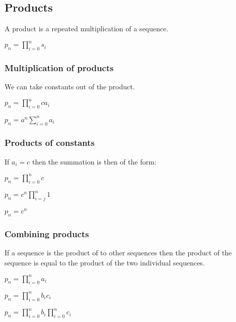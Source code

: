 
\subsection{Products}


A product is a repeated multiplication of a sequence.

$p_n=\prod_{i=0}^ns_i$

\subsubsection{Multiplication of products}

We can take constants out of the product.

$p_n=\prod_{i=0}^nca_i$

$p_n=a^{n}\sum_{i=0}^na_i$

\subsubsection{Products of constants}

If \(a_i=c\) then the summation is then of the form:

$p_n=\prod_{i=0}^nc$

$p_n=c^{n}\prod_{i=j}^n1$

$p_n=c^{n}$

\subsubsection{Combining products}

If a sequence is the product of to other sequences then the product of the sequence is equal to the product of the two individual sequences.

\(p_n=\prod_{i=0}^na_i\)

\(p_n=\prod_{i=0}^nb_ic_i\)

\(p_n=\prod_{i=0}^nb_i\prod_{i=0}^nc_i\)

